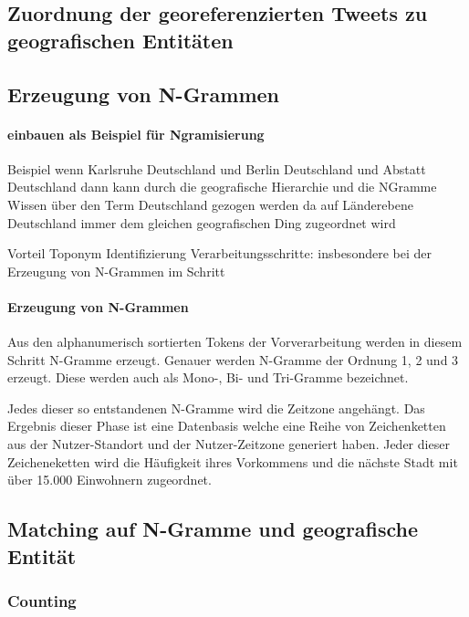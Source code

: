 		\subsection{Zuordnung der georeferenzierten Tweets zu geografischen Entitäten} 

		\subsection{Erzeugung von N-Grammen}

				\paragraph{einbauen als Beispiel für Ngramisierung} 
				Beispiel wenn Karlsruhe Deutschland und Berlin Deutschland und Abstatt Deutschland dann kann durch die geografische Hierarchie und die NGramme Wissen über den Term Deutschland gezogen werden da auf Länderebene Deutschland immer dem gleichen geografischen Ding zugeordnet wird 

				Vorteil Toponym Identifizierung Verarbeitungsschritte:  insbesondere bei der Erzeugung von N-Grammen im Schritt 

		  		\paragraph{Erzeugung von N-Grammen}
			  	Aus den alphanumerisch sortierten Tokens der Vorverarbeitung werden in diesem Schritt N-Gramme erzeugt.
			  	Genauer werden N-Gramme der Ordnung 1, 2 und 3 erzeugt.
			  	Diese werden auch als Mono-, Bi- und Tri-Gramme bezeichnet.  

			  	Jedes dieser so entstandenen N-Gramme wird die Zeitzone angehängt.  
				Das Ergebnis dieser Phase ist eine Datenbasis welche eine Reihe von Zeichenketten aus der Nutzer-Standort und der Nutzer-Zeitzone generiert haben. 
				Jeder dieser Zeicheneketten wird die Häufigkeit ihres Vorkommens und die nächste Stadt mit über 15.000 Einwohnern zugeordnet. 

				
		\subsection{Matching auf N-Gramme und geografische Entität}

			\subsubsection{Counting} 


